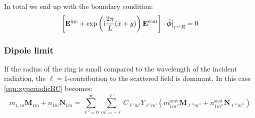 In total we end up with the boundary condition:
\begin{equation}
\left[\mathbf{E}^\text{inc}+\exp\left(\mathrm{i} \frac{2\pi}{L}(x+y)\right)\mathbf{E}^\text{scat}\right] \cdot \hat{\bm{\phi}}\big|_{r=R} = 0
\label{eqn:xyperiodicBC}
\end{equation}

\subsubsection{Dipole limit}
If the radius of the ring is small compared to the wavelength of the incident radiation, the $\ell=1$-contribution to the scattered field is dominant.
In this case \cref{eqn:xyperiodicBC} becomes:
\begin{equation}
m_{1,m} \mathbf{M}_{1 m} + n_{1 m} \mathbf{N}_{1 m} = \sum_{\ell'=0}^\infty\sum_{m'=-\ell}^{\ell'}
C_{\ell' m'} Y_{\ell' m'} 
\left(
m^\text{scat}_{1 m''} \mathbf{M}_{\ell'' m''} +
n^\text{scat}_{1 m''} \mathbf{N}_{\ell'' m''}
\right)
\end{equation}